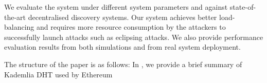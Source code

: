 We evaluate the system under different system parameters and against state-of-the-art decentralised discovery systems. Our system achieves better load-balancing and requires more resource consumption by the attackers to successfully launch attacks such as eclipsing attacks. We also provide performance evaluation results from both simulations and from real system deployment.  
    
The structure of the paper is as follows: In , we provide a brief summary of Kademlia DHT used by Ethereum
